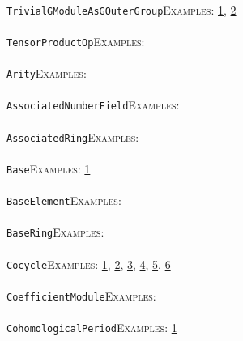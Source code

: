 \documentclass[a4paper,11pt]{report}
\begin{document}
{{ \\
 \texttt{TrivialGModuleAsGOuterGroup}{\nobreakspace}{\nobreakspace}{\nobreakspace}{\nobreakspace}\textsc{Examples:} \href{../www/SideLinks/About/aboutCoefficientSequence.html} {1}{\nobreakspace}, \href{../www/SideLinks/About/aboutGouter.html} {2}{\nobreakspace} \\
 \\
 \texttt{TensorProductOp}{\nobreakspace}{\nobreakspace}{\nobreakspace}{\nobreakspace}\textsc{Examples:} \\
 \\
 \texttt{Arity}{\nobreakspace}{\nobreakspace}{\nobreakspace}{\nobreakspace}\textsc{Examples:} \\
 \\
 \texttt{AssociatedNumberField}{\nobreakspace}{\nobreakspace}{\nobreakspace}{\nobreakspace}\textsc{Examples:} \\
 \\
 \texttt{AssociatedRing}{\nobreakspace}{\nobreakspace}{\nobreakspace}{\nobreakspace}\textsc{Examples:} \\
 \\
 \texttt{Base}{\nobreakspace}{\nobreakspace}{\nobreakspace}{\nobreakspace}\textsc{Examples:} \href{../www/SideLinks/About/aboutKnots.html} {1}{\nobreakspace} \\
 \\
 \texttt{BaseElement}{\nobreakspace}{\nobreakspace}{\nobreakspace}{\nobreakspace}\textsc{Examples:} \\
 \\
 \texttt{BaseRing}{\nobreakspace}{\nobreakspace}{\nobreakspace}{\nobreakspace}\textsc{Examples:} \\
 \\
 \texttt{Cocycle}{\nobreakspace}{\nobreakspace}{\nobreakspace}{\nobreakspace}\textsc{Examples:} \href{../www/SideLinks/About/aboutCocycles.html} {1}{\nobreakspace}, \href{../www/SideLinks/About/aboutPolytopes.html} {2}{\nobreakspace}, \href{../www/SideLinks/About/aboutCrossedMods} {3}{\nobreakspace}, \href{../www/SideLinks/About/aboutCrossedMods.html} {4}{\nobreakspace}, \href{../www/SideLinks/About/aboutRosenbergerMonster.html} {5}{\nobreakspace}, \href{../www/SideLinks/About/aboutGouter.html} {6}{\nobreakspace} \\
 \\
 \texttt{CoefficientModule}{\nobreakspace}{\nobreakspace}{\nobreakspace}{\nobreakspace}\textsc{Examples:} \\
 \\
 \texttt{CohomologicalPeriod}{\nobreakspace}{\nobreakspace}{\nobreakspace}{\nobreakspace}\textsc{Examples:} \href{tutorial/chap10.html} {1}{\nobreakspace} \\
}}
\end{document}

